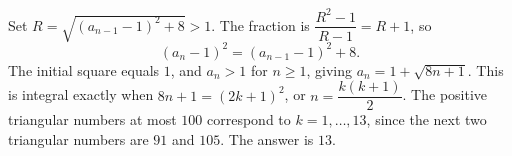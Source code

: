 Set $R=\sqrt{(a_{n-1}-1)^2+8}>1$. The fraction is $\dfrac{R^2-1}{R-1}=R+1$, so
\[
(a_n-1)^2=(a_{n-1}-1)^2+8.
\]
The initial square equals $1$, and $a_n>1$ for $n\ge1$, giving $a_n=1+\sqrt{8n+1}$. This is integral exactly when $8n+1=(2k+1)^2$, or $n=\dfrac{k(k+1)}{2}$. The positive triangular numbers at most $100$ correspond to $k=1,\ldots,13$, since the next two triangular numbers are $91$ and $105$. The answer is $\boxed{13}$.
